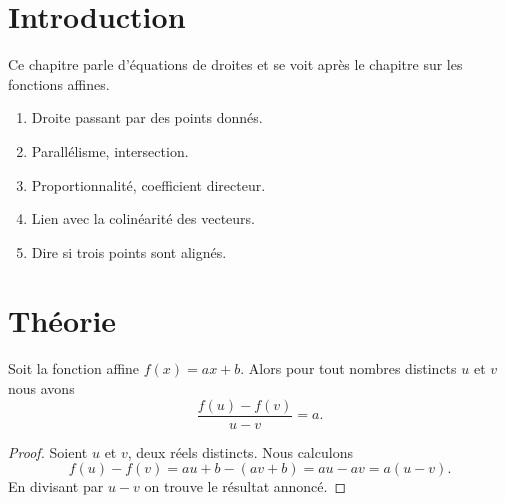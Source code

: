 

\section{Introduction}

Ce chapitre parle d'équations de droites et se voit après le chapitre sur les fonctions affines.
\begin{enumerate}
    \item
        Droite passant par des points donnés.
    \item 
        Parallélisme, intersection.
    \item
        Proportionnalité, coefficient directeur.
    \item
        Lien avec la colinéarité des vecteurs.
    \item
        Dire si trois points sont alignés.
\end{enumerate}

\section{Théorie}

\begin{theorem}
    Soit la fonction affine \( f(x)=ax+b\). Alors pour tout nombres distincts \( u\) et \( v\) nous avons
    \begin{equation}
        \frac{ f(u)-f(v) }{ u-v }=a.
    \end{equation}
\end{theorem}

\begin{proof}
    Soient \( u\) et \( v\), deux réels distincts. Nous calculons
    \begin{equation}
        f(u)-f(v)=au+b-(av+b)=au-av=a(u-v).
    \end{equation}
    En divisant par \( u-v\) on trouve le résultat annoncé.
\end{proof}

